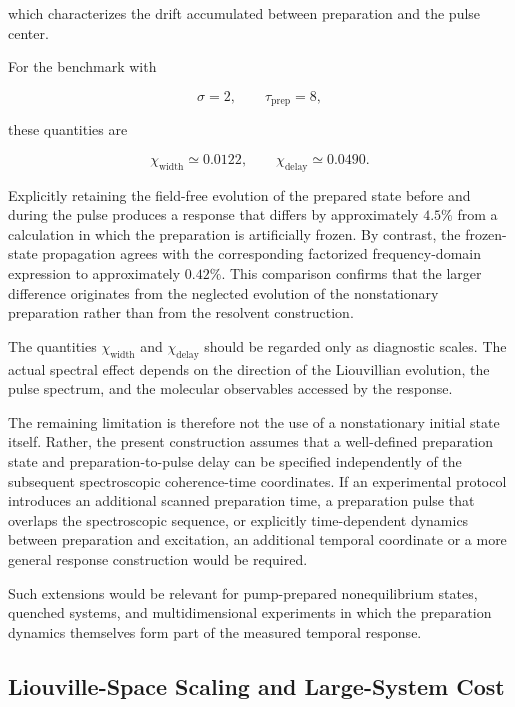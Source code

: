 \documentclass[11pt]{article}
\begin{document}
which characterizes the drift accumulated between preparation and the
pulse center.

For the benchmark with

\begin{equation}
\sigma=2,
\qquad
\tau_{\mathrm{prep}}=8,
\end{equation}

these quantities are

\begin{equation}
\chi_{\mathrm{width}}
\simeq
0.0122,
\qquad
\chi_{\mathrm{delay}}
\simeq
0.0490.
\end{equation}

Explicitly retaining the field-free evolution of the prepared state
before and during the pulse produces a response that differs by
approximately $4.5\%$ from a calculation in which the preparation is
artificially frozen. By contrast, the frozen-state propagation agrees
with the corresponding factorized frequency-domain expression to
approximately $0.42\%$. This comparison confirms that the larger
difference originates from the neglected evolution of the
nonstationary preparation rather than from the resolvent construction.

The quantities $\chi_{\mathrm{width}}$ and
$\chi_{\mathrm{delay}}$ should be regarded only as diagnostic scales.
The actual spectral effect depends on the direction of the
Liouvillian evolution, the pulse spectrum, and the molecular
observables accessed by the response.

The remaining limitation is therefore not the use of a nonstationary
initial state itself. Rather, the present construction assumes that a
well-defined preparation state and preparation-to-pulse delay can be
specified independently of the subsequent spectroscopic coherence-time
coordinates. If an experimental protocol introduces an additional
scanned preparation time, a preparation pulse that overlaps the
spectroscopic sequence, or explicitly time-dependent dynamics between
preparation and excitation, an additional temporal coordinate or a
more general response construction would be required.

Such extensions would be relevant for pump-prepared nonequilibrium
states, quenched systems, and multidimensional experiments in which the
preparation dynamics themselves form part of the measured temporal
response.
\subsection{Liouville-Space Scaling and Large-System Cost}
\label{subsec:liouville_scaling_limitation}
\end{document}
